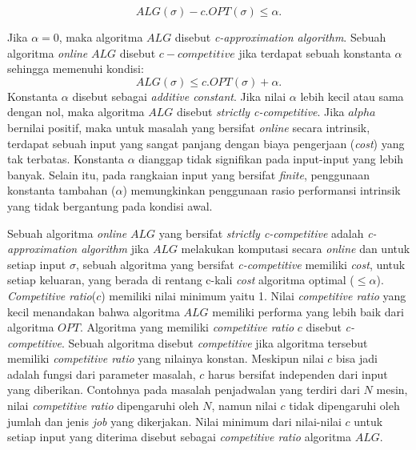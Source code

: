 \begin{equation}\label{rumus_c_approx}
	ALG(\sigma)-c.OPT(\sigma)\leq \alpha.
\end{equation}

Jika $\alpha = 0$, maka algoritma $ALG$ disebut \textit{c-approximation algorithm}. Sebuah algoritma \textit{online} $ALG$ disebut $c-competitive$ jika terdapat sebuah konstanta $\alpha$ sehingga memenuhi kondisi:
\begin{equation}\label{rumus_c_competitive}
	ALG(\sigma)\leq c.OPT(\sigma)+\alpha.
\end{equation}
Konstanta $\alpha$ disebut sebagai \textit{additive constant}. Jika nilai $\alpha$ lebih kecil atau sama dengan nol, maka algoritma $ALG$ disebut \textit{strictly c-competitive}. Jika $alpha$ bernilai positif, maka untuk masalah yang bersifat \textit{online} secara intrinsik, terdapat sebuah input yang sangat panjang dengan biaya pengerjaan (\textit{cost}) yang tak terbatas. Konstanta $\alpha$ dianggap tidak signifikan pada input-input yang lebih banyak. Selain itu, pada rangkaian input yang bersifat \textit{finite}, penggunaan konstanta tambahan ($\alpha$) memungkinkan penggunaan rasio performansi intrinsik yang tidak bergantung pada kondisi awal.

\par Sebuah algoritma \textit{online} $ALG$ yang bersifat \textit{strictly c-competitive} adalah \textit{c-approximation algorithm} jika $ALG$ melakukan komputasi secara \textit{online} dan untuk setiap input $\sigma$, sebuah algoritma yang bersifat \textit{c-competitive} memiliki \textit{cost}, untuk setiap keluaran, yang berada di rentang c-kali \textit{cost} algoritma optimal ($\leq\alpha$). \textit{Competitive ratio}($c$) memiliki nilai minimum yaitu 1. Nilai \textit{competitive ratio} yang kecil menandakan bahwa algoritma $ALG$ memiliki performa yang lebih baik dari algoritma $OPT$. Algoritma yang memiliki \textit{competitive ratio} $c$ disebut \textit{c-competitive}. Sebuah algoritma disebut \textit{competitive} jika algoritma tersebut memiliki \textit{competitive ratio} yang nilainya konstan. Meskipun nilai $c$ bisa jadi adalah fungsi dari parameter masalah, $c$ harus bersifat independen dari input yang diberikan. Contohnya pada masalah penjadwalan yang terdiri dari $N$ mesin, nilai \textit{competitive ratio} dipengaruhi oleh $N$, namun nilai $c$ tidak dipengaruhi oleh jumlah dan jenis \textit{job} yang dikerjakan. Nilai minimum dari nilai-nilai $c$ untuk setiap input yang diterima disebut sebagai  \textit{competitive ratio} algoritma $ALG$.
 
